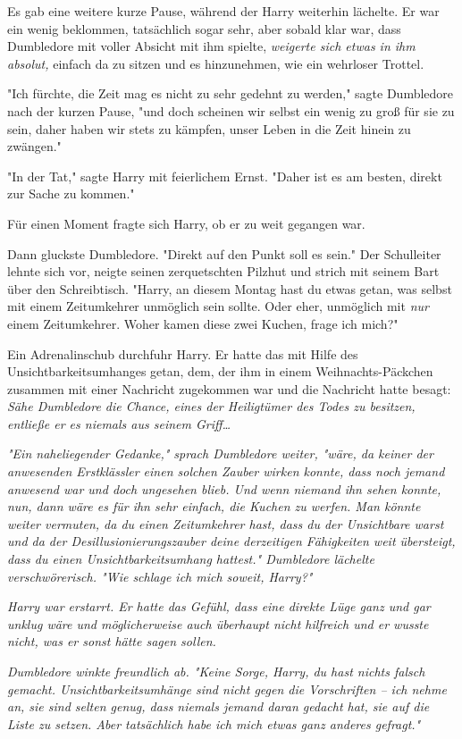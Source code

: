 {Es gab eine weitere kurze Pause, während der Harry weiterhin lächelte. Er war ein wenig beklommen, tatsächlich sogar sehr, aber sobald klar war, dass Dumbledore mit voller Absicht mit ihm spielte, \emph{weigerte sich etwas in ihm absolut,} einfach da zu sitzen und es hinzunehmen, wie ein wehrloser Trottel.

"Ich fürchte, die Zeit mag es nicht zu sehr gedehnt zu werden," sagte Dumbledore nach der kurzen Pause, "und doch scheinen wir selbst ein wenig zu groß für sie zu sein, daher haben wir stets zu kämpfen, unser Leben in die Zeit hinein zu zwängen."

"In der Tat," sagte Harry mit feierlichem Ernst. "Daher ist es am besten, direkt zur Sache zu kommen."

Für einen Moment fragte sich Harry, ob er zu weit gegangen war.

Dann gluckste Dumbledore. "Direkt auf den Punkt soll es sein." Der Schulleiter lehnte sich vor, neigte seinen zerquetschten Pilzhut und strich mit seinem Bart über den Schreibtisch. "Harry, an diesem Montag hast du etwas getan, was selbst mit einem Zeitumkehrer unmöglich sein sollte. Oder eher, unmöglich mit \emph{nur} einem Zeitumkehrer. Woher kamen diese zwei Kuchen, frage ich mich?"

Ein Adrenalinschub durchfuhr Harry. Er hatte das mit Hilfe des Unsichtbarkeitsumhanges getan, dem, der ihm in einem Weihnachts-Päckchen zusammen mit einer Nachricht zugekommen war und die Nachricht hatte besagt: \emph{Sähe Dumbledore die Chance, eines der Heiligtümer des Todes zu besitzen, entließe er es niemals aus seinem Griff…}

\emph{"Ein naheliegender Gedanke," sprach Dumbledore weiter, "wäre, da keiner der anwesenden Erstklässler einen solchen Zauber wirken konnte, dass noch jemand anwesend war und doch ungesehen blieb. Und wenn niemand ihn sehen konnte, nun, dann wäre es für ihn sehr einfach, die Kuchen zu werfen. Man könnte weiter vermuten, da du einen Zeitumkehrer hast, dass du der Unsichtbare warst und da der Desillusionierungszauber deine derzeitigen Fähigkeiten weit übersteigt, dass du einen Unsichtbarkeitsumhang hattest." Dumbledore lächelte verschwörerisch. "Wie schlage ich mich soweit, Harry?"}

\emph{Harry war erstarrt. Er hatte das Gefühl, dass eine direkte Lüge ganz und gar unklug wäre und möglicherweise auch überhaupt nicht hilfreich und er wusste nicht, was er sonst hätte sagen sollen.}

\emph{Dumbledore winkte freundlich ab. "Keine Sorge, Harry, du hast nichts falsch gemacht. Unsichtbarkeitsumhänge sind nicht gegen die Vorschriften -- ich nehme an, sie sind selten genug, dass niemals jemand daran gedacht hat, sie auf die Liste zu setzen. Aber tatsächlich habe ich mich etwas ganz anderes gefragt."}

}

